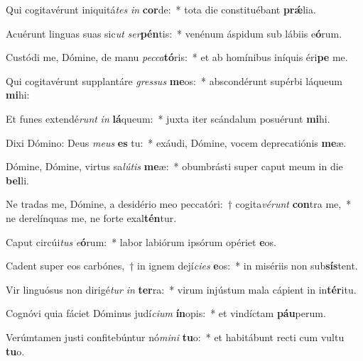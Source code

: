 \item Qui cogitavérunt iniquitá\textit{tes} \textit{in} \textbf{cor}de:~* tota die constituébant \textbf{prǽ}lia.
\item Acuérunt linguas suas sic\textit{ut} \textit{ser}\textbf{pén}tis:~* venénum áspidum sub lábiis e\textbf{ó}rum.
\item Custódi me, Dómine, de manu \textit{pec}\textit{ca}\textbf{tó}ris:~* et ab homínibus iníquis éri\textbf{pe} me.
\item Qui cogitavérunt supplantáre \textit{gres}\textit{sus} \textbf{me}os:~* abscondérunt supérbi láqueum \textbf{mi}hi:
\item Et funes extendé\textit{runt} \textit{in} \textbf{lá}queum:~* juxta iter scándalum posuérunt \textbf{mi}hi.
\item Dixi Dómino: Deus \textit{me}\textit{us} \textbf{es} tu:~* exáudi, Dómine, vocem deprecatiónis \textbf{me}æ.
\item Dómine, Dómine, virtus sa\textit{lú}\textit{tis} \textbf{me}æ:~* obumbrásti super caput meum in die \textbf{bel}li.
\item Ne tradas me, Dómine, a desidério meo peccatóri:~† cogita\textit{vé}\textit{runt} \textbf{con}tra me,~* ne derelínquas me, ne forte exal\textbf{tén}tur.
\item Caput circúi\textit{tus} \textit{e}\textbf{ó}rum:~* labor labiórum ipsórum opériet \textbf{e}os.
\item Cadent super eos carbónes,~† in ignem dejí\textit{ci}\textit{es} \textbf{e}os:~* in misériis non sub\textbf{sís}tent.
\item Vir linguósus non dirigé\textit{tur} \textit{in} \textbf{ter}ra:~* virum injústum mala cápient in in\textbf{tér}itu.
\item Cognóvi quia fáciet Dóminus judí\textit{ci}\textit{um} \textbf{ín}opis:~* et vindíctam \textbf{páu}perum.
\item Verúmtamen justi confitebúntur nó\textit{mi}\textit{ni} \textbf{tu}o:~* et habitábunt recti cum vultu \textbf{tu}o.
